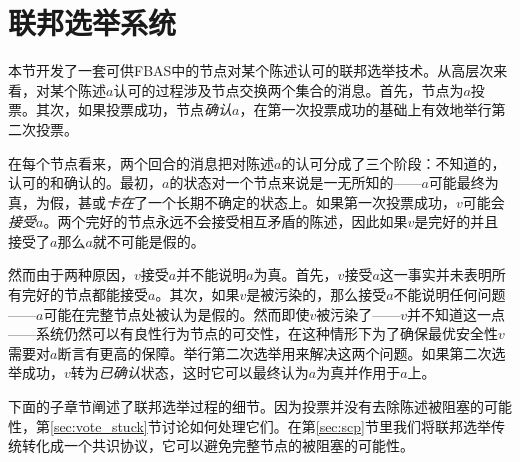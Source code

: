 \section{联邦选举系统}\label{sec:voting}

本节开发了一套可供FBAS中的节点对某个陈述认可的联邦选举技术。从高层次来看，对某个陈述$a$认可的过程涉及节点交换两个集合的消息。首先，节点为$a$投票。其次，如果投票成功，节点\textit{确认}$a$，在第一次投票成功的基础上有效地举行第二次投票。

在每个节点看来，两个回合的消息把对陈述$a$的认可分成了三个阶段：不知道的，认可的和确认的。最初，$a$的状态对一个节点来说是一无所知的——$a$可能最终为真，为假，甚或\textit{卡在}了一个长期不确定的状态上。如果第一次投票成功，$v$可能会\textit{接受}$a$。两个完好的节点永远不会接受相互矛盾的陈述，因此如果$v$是完好的并且接受了$a$那么$a$就不可能是假的。

然而由于两种原因，$v$接受$a$并不能说明$a$为真。首先，$v$接受$a$这一事实并未表明所有完好的节点都能接受$a$。其次，如果$v$是被污染的，那么接受$a$不能说明任何问题——$a$可能在完整节点处被认为是假的。然而即使$v$被污染了——$v$并不知道这一点——系统仍然可以有良性行为节点的{\quorum}可交性，在这种情形下为了确保最优安全性$v$需要对$a$断言有更高的保障。举行第二次选举用来解决这两个问题。如果第二次选举成功，$v$转为\textit{已确认}状态，这时它可以最终认为$a$为真并作用于$a$上。

下面的子章节阐述了联邦选举过程的细节。因为投票并没有去除陈述被阻塞的可能性，第\ref{sec:vote_stuck}节讨论如何处理它们。在第\ref{sec:scp}节里我们将联邦选举传统转化成一个共识协议，它可以避免完整节点的被阻塞{\slot}的可能性。






